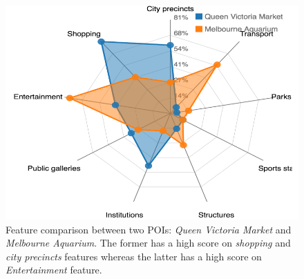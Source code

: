 \begin{figure}[t!]
\includegraphics[width=0.8\linewidth]{figure/sample_radar.png}
    \caption{Feature comparison between two POIs: \textit{Queen Victoria Market} and \textit{Melbourne Aquarium}. The former has a high score on \textit{shopping} and \textit{city precincts} features whereas the latter has a high score on \textit{Entertainment} feature.}
\label{fig:radar} \vspace{-1em}
\end{figure}
